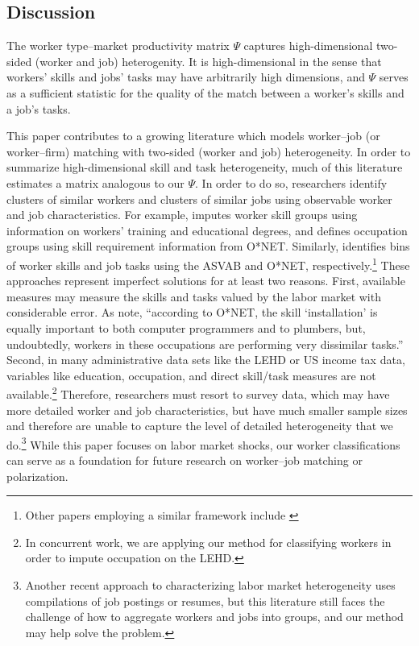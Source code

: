 \documentclass[12pt]{article}
\theoremstyle{definition}
\theoremstyle{plain}
\begin{document}
\subsection{Discussion}

The worker type--market productivity matrix $\Psi$ captures high-dimensional two-sided (worker and job) heterogenity. It is high-dimensional in the sense that workers' skills and jobs' tasks may have arbitrarily high dimensions, and $\Psi$ serves as a sufficient statistic for the quality of the match between a worker's skills and a job's tasks. 



This paper contributes to a growing literature which models worker--job (or worker--firm) matching with two-sided (worker and job) heterogeneity. In order to summarize high-dimensional skill and task heterogeneity, much of this literature estimates a matrix analogous to our $\Psi$. In order to do so, researchers identify clusters of similar workers and clusters of similar jobs using observable worker and job characteristics. For example, \citet{Lindenlaub2017} imputes worker skill groups using information on workers' training and educational degrees, and defines occupation groups using skill requirement information from O*NET. Similarly, \citet{Tan2018} identifies bins of worker skills and job tasks using the ASVAB and O*NET, respectively.\footnote{Other papers employing a similar framework include \citet{AutorLevyMurnane2003,AcemogluAutor2011,Kantenga2018}}  These approaches represent imperfect solutions for at least two reasons. First, available measures may measure the skills and tasks valued by the labor market with considerable error. As \citet{FrankAutorBessenBrynjolfssonCebrianDemingFeldmanGrohLoboMoro2019} note, ``according to O*NET, the skill `installation' is equally important to both computer programmers and to plumbers, but, undoubtedly, workers in these occupations are performing very dissimilar tasks.'' Second, in many administrative data sets like the LEHD or US income tax data, variables like education, occupation, and direct skill/task measures are not available.\footnote{In concurrent work, we are applying our method for classifying workers in order to impute occupation on the LEHD.} Therefore, researchers must resort to survey data, which may have more detailed worker and job characteristics, but have much smaller sample sizes and therefore are unable to capture the level of detailed heterogeneity that we do.\footnote{Another recent approach to characterizing labor market heterogeneity uses compilations of job postings or resumes, but this literature still faces the challenge of how to aggregate workers and jobs into groups, and our method may help solve the problem.} While this paper focuses on labor market shocks, our worker classifications can serve as a foundation for future research on worker--job matching or polarization. 
\end{document}
